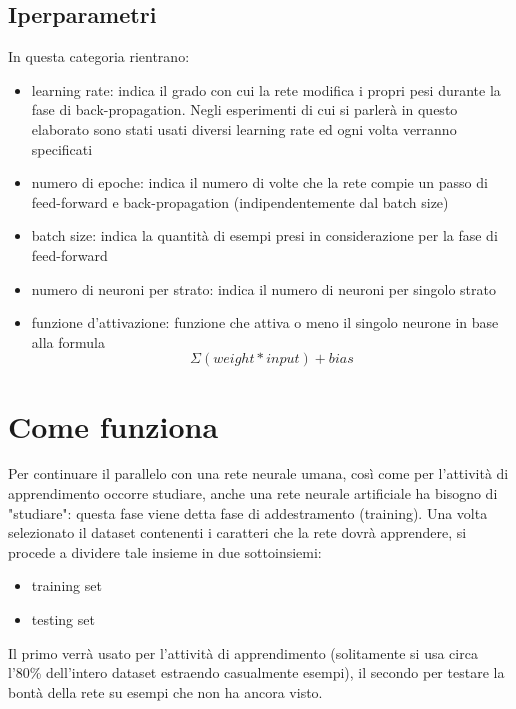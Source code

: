 \documentclass[12pt]{report}
\begin{document}
\subsection{Iperparametri}\label{iperparametri}
In questa categoria rientrano:
\begin{itemize}
\item{learning rate}: indica il grado con cui la rete modifica i propri pesi durante la fase di back-propagation. Negli esperimenti di cui si parlerà in questo elaborato sono stati usati diversi learning rate ed ogni volta verranno specificati
\item{numero di epoche}: indica il numero di volte che la rete compie un passo di feed-forward e back-propagation (indipendentemente dal batch size)
\item{batch size}: indica la quantità di esempi presi in considerazione per la fase di feed-forward
\item{numero di neuroni per strato}: indica il numero di neuroni per singolo strato
\item{funzione d'attivazione}: funzione che attiva o meno il singolo neurone in base alla formula $$\Sigma\left(weight * input\right) + bias$$
\end{itemize}

\section{Come funziona}
Per continuare il parallelo con una rete neurale umana, così come per l'attività di apprendimento occorre studiare, anche una rete neurale artificiale ha bisogno di "studiare": questa fase viene detta fase di addestramento (training).
Una volta selezionato il dataset contenenti i caratteri che la rete dovrà apprendere, si procede a dividere tale insieme in due sottoinsiemi:

\begin{itemize}
\item{training set}
\item{testing set}
\end{itemize}

Il primo verrà usato per l'attività di apprendimento (solitamente si usa circa l'80\% dell'intero dataset estraendo casualmente esempi), il secondo per testare la bontà della rete su esempi che non ha ancora visto.
\end{document}

